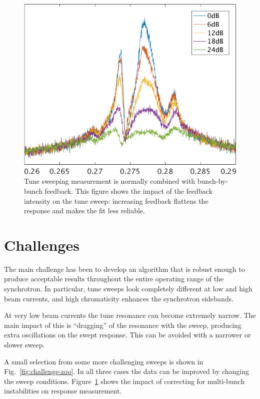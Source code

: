 \documentclass[
    a4paper,
    keeplastbox,            %
    hyphens,                %
    nospread,               %
    refpage,                %
]{jacow}
\newcommand{\squarecaption}[2][1]{\caption[#1]{#2\unskip\parfillskip 0pt}}
\begin{document}
\begin{figure}[ht]
\includegraphics[width=\linewidth]{WECO03f7.png}
\squarecaption{%
Tune sweeping measurement is normally combined with bunch-by-bunch feedback.
This figure shows the impact of the feedback intensity on the tune sweep:
increasing feedback flattens the response and makes the fit less reliable.
}
\label{fig:feedback}
\end{figure}


\section{Challenges}

The main challenge has been to develop an algorithm that is robust enough to
produce acceptable results throughout the entire operating range of the
synchrotron.  In particular, tune sweeps look completely different at low and
high beam currents, and high chromaticity enhances the synchrotron sidebands.

At very low beam currents the tune resonance can become extremely narrow.  The
main impact of this is ``dragging'' of the resonance with the sweep, producing
extra oscillations on the swept response.  This can be avoided with a narrower
or slower sweep.

A small selection from some more challenging sweeps is shown in
Fig.~\ref{fig:challenge-zoo}.  In all three cases the data can be improved by
changing the sweep conditions.  Figure~\ref{fig:feedback} shows the impact of
correcting for multi-bunch instabilities on response measurement.
\end{document}
